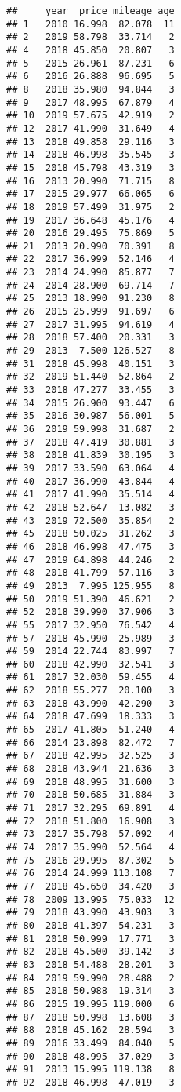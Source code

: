 \documentclass[
]{article}
\begin{document}
\begin{verbatim}
##     year  price mileage age
## 1   2010 16.998  82.078  11
## 2   2019 58.798  33.714   2
## 4   2018 45.850  20.807   3
## 5   2015 26.961  87.231   6
## 6   2016 26.888  96.695   5
## 8   2018 35.980  94.844   3
## 9   2017 48.995  67.879   4
## 10  2019 57.675  42.919   2
## 12  2017 41.990  31.649   4
## 13  2018 49.858  29.116   3
## 14  2018 46.998  35.545   3
## 15  2018 45.798  43.319   3
## 16  2013 20.990  71.715   8
## 17  2015 29.977  66.065   6
## 18  2019 57.499  31.975   2
## 19  2017 36.648  45.176   4
## 20  2016 29.495  75.869   5
## 21  2013 20.990  70.391   8
## 22  2017 36.999  52.146   4
## 23  2014 24.990  85.877   7
## 24  2014 28.900  69.714   7
## 25  2013 18.990  91.230   8
## 26  2015 25.999  91.697   6
## 27  2017 31.995  94.619   4
## 28  2018 57.400  20.331   3
## 29  2013  7.500 126.527   8
## 31  2018 45.998  40.151   3
## 32  2019 51.440  52.864   2
## 33  2018 47.277  33.455   3
## 34  2015 26.900  93.447   6
## 35  2016 30.987  56.001   5
## 36  2019 59.998  31.687   2
## 37  2018 47.419  30.881   3
## 38  2018 41.839  30.195   3
## 39  2017 33.590  63.064   4
## 40  2017 36.990  43.844   4
## 41  2017 41.990  35.514   4
## 42  2018 52.647  13.082   3
## 43  2019 72.500  35.854   2
## 45  2018 50.025  31.262   3
## 46  2018 46.998  47.475   3
## 47  2019 64.898  44.246   2
## 48  2018 41.799  57.116   3
## 49  2013  7.995 125.955   8
## 50  2019 51.390  46.621   2
## 52  2018 39.990  37.906   3
## 55  2017 32.950  76.542   4
## 57  2018 45.990  25.989   3
## 59  2014 22.744  83.997   7
## 60  2018 42.990  32.541   3
## 61  2017 32.030  59.455   4
## 62  2018 55.277  20.100   3
## 63  2018 43.990  42.290   3
## 64  2018 47.699  18.333   3
## 65  2017 41.805  51.240   4
## 66  2014 23.898  82.472   7
## 67  2018 42.995  32.525   3
## 68  2018 43.944  21.636   3
## 69  2018 48.995  31.600   3
## 70  2018 50.685  31.884   3
## 71  2017 32.295  69.891   4
## 72  2018 51.800  16.908   3
## 73  2017 35.798  57.092   4
## 74  2017 35.990  52.564   4
## 75  2016 29.995  87.302   5
## 76  2014 24.999 113.108   7
## 77  2018 45.650  34.420   3
## 78  2009 13.995  75.033  12
## 79  2018 43.990  43.903   3
## 80  2018 41.397  54.231   3
## 81  2018 50.999  17.771   3
## 82  2018 45.500  39.142   3
## 83  2018 54.488  28.201   3
## 84  2019 59.990  28.488   2
## 85  2018 50.988  19.314   3
## 86  2015 19.995 119.000   6
## 87  2018 50.998  13.608   3
## 88  2018 45.162  28.594   3
## 89  2016 33.499  84.040   5
## 90  2018 48.995  37.029   3
## 91  2013 15.995 119.138   8
## 92  2018 46.998  47.019   3

\end{verbatim}
\end{document}
